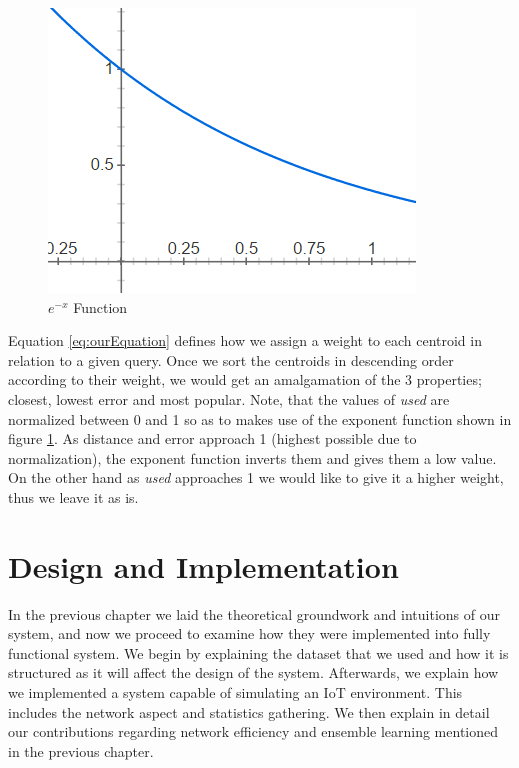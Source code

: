 \documentclass{mproj}
\begin{document}
\begin{figure}[H]
\caption{$e^{-x}$ Function}
\label{fig:e-x}
\centerline{\includegraphics[scale=0.6]{e-x}}
\end{figure}

Equation \ref{eq:ourEquation} defines how we assign a weight to each centroid in relation to a given query. Once we sort the centroids in descending order according to their weight, we would get an amalgamation of the 3 properties; closest, lowest error and most popular. Note, that the values of \textit{used} are normalized between 0 and 1 so as to makes use of the exponent function shown in figure \ref{fig:e-x}. As distance and error approach 1 (highest possible due to normalization), the exponent function inverts them and gives them a low value. On the other hand as \textit{used} approaches 1 we would like to give it a higher weight, thus we leave it as is.

\chapter{Design and Implementation}
In the previous chapter we laid the theoretical groundwork and intuitions of our system, and now we proceed to examine how they were implemented into fully functional system. We begin by explaining the dataset that we used and how it is structured as it will affect the design of the system. Afterwards, we explain how we implemented a system capable of simulating an IoT environment. This includes the network aspect and statistics gathering. We then explain in detail our contributions regarding network efficiency and ensemble learning mentioned in the previous chapter.
\end{document}

